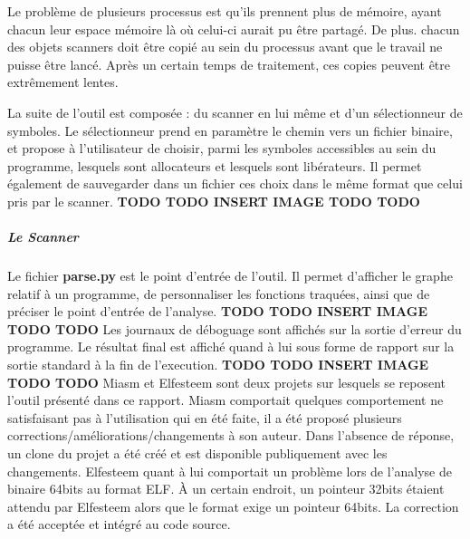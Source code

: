 Le problème de plusieurs processus est qu'ils prennent plus de mémoire, ayant chacun leur espace mémoire là où celui-ci aurait pu être partagé. De plus. chacun des objets scanners doit être copié
au sein du processus avant que le travail ne puisse être lancé. Après un certain temps de traitement, ces copies peuvent être extrêmement lentes.

La suite de l'outil est composée : du scanner en lui même et d'un sélectionneur de symboles.
Le sélectionneur prend en paramètre le chemin vers un fichier binaire, et propose à l'utilisateur de choisir, parmi les symboles accessibles au sein du programme,
lesquels sont allocateurs et lesquels sont libérateurs. Il permet également de sauvegarder dans un fichier ces choix dans le même format que celui pris par le scanner.
\textbf{TODO TODO INSERT IMAGE TODO TODO}
\subparagraph{Le Scanner}
Le fichier \textbf{parse.py} est le point d'entrée de l'outil. Il permet d'afficher le graphe relatif à un programme, de personnaliser les fonctions traquées, ainsi que de préciser
le point d'entrée de l'analyse.
\textbf{TODO TODO INSERT IMAGE TODO TODO}
Les journaux de déboguage sont affichés sur la sortie d'erreur du programme. Le résultat final est affiché quand à lui sous forme de rapport sur la sortie standard à la fin de l'execution.
\textbf{TODO TODO INSERT IMAGE TODO TODO}
Miasm et Elfesteem sont deux projets sur lesquels se reposent l'outil présenté dans ce rapport. Miasm comportait quelques comportement ne satisfaisant pas à l'utilisation qui en été faite,
il a été proposé plusieurs corrections/améliorations/changements à son auteur. Dans l'absence de réponse, un clone du projet a été créé et est disponible publiquement avec les changements.
Elfesteem quant à lui comportait un problème lors de l'analyse de binaire 64bits au format ELF. À un certain endroit, un pointeur 32bits étaient attendu par Elfesteem alors que le format
exige un pointeur 64bits. La correction a été acceptée et intégré au code source.

